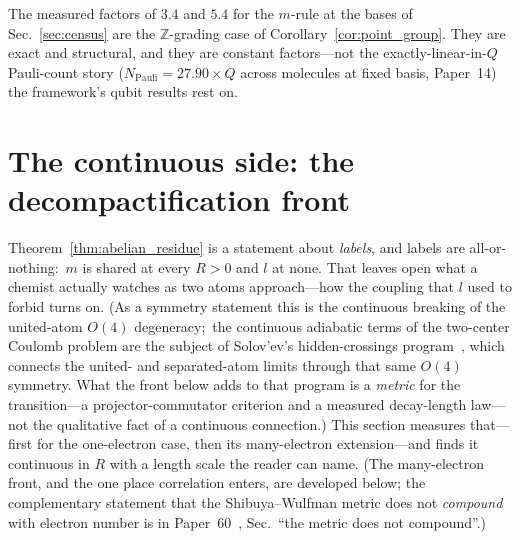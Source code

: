 \documentclass[aps,pra,twocolumn,superscriptaddress,longbibliography]{revtex4-2}
\begin{document}
The measured factors of $3.4$ and $5.4$ for the $m$-rule at the bases of
Sec.~\ref{sec:census} are the $\mathbb{Z}$-grading case of
Corollary~\ref{cor:point_group}.  They are exact and structural, and they are
constant factors---not the exactly-linear-in-$Q$ Pauli-count story
($N_{\mathrm{Pauli}} = 27.90 \times Q$ across molecules at fixed
basis, Paper~14) the framework's qubit results rest on.

\section{The continuous side: the decompactification front}
\label{sec:continuous}

Theorem~\ref{thm:abelian_residue} is a statement about \emph{labels}, and
labels are all-or-nothing:\ $m$ is shared at every $R > 0$ and $l$ at
none.  That leaves open what a chemist actually watches as two atoms
approach---how the coupling that $l$ used to forbid turns on.  (As a
symmetry statement this is the continuous breaking of the united-atom
$O(4)$ degeneracy;\ the continuous adiabatic terms of the two-center
Coulomb problem are the subject of Solov'ev's hidden-crossings
program~\cite{solovev2005,grozdanov_solovev1991}, which connects the
united- and separated-atom limits through that same $O(4)$ symmetry.
What the front below adds to that program is a \emph{metric} for the
transition---a projector-commutator criterion and a measured decay-length
law---not the qualitative fact of a continuous connection.)  This section
measures that---first for the one-electron case, then its many-electron
extension---and finds it continuous in $R$ with a length scale the reader can
name.  (The many-electron front, and the one place correlation enters, are
developed below; the complementary statement that the Shibuya--Wulfman metric
does not \emph{compound} with electron number is in
Paper~60~\cite{loutey_paper60}, Sec.~``the metric does not compound''.)
\end{document}
